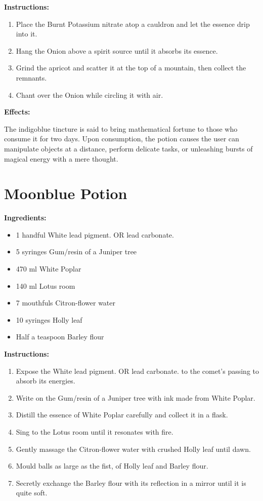 \documentclass{article}
\begin{document}
\textbf{Instructions:}

\begin{enumerate}
  \item Place the Burnt Potassium nitrate atop a cauldron and let the essence drip into it.
  \item Hang the Onion above a spirit source until it absorbs its essence.
  \item Grind the apricot and scatter it at the top of a mountain, then collect the remnants.
  \item Chant over the Onion while circling it with air.
\end{enumerate}

\textbf{Effects:}

The indigoblue tincture is said to bring mathematical fortune to those who consume it for two days. Upon consumption, the potion causes the user can manipulate objects at a distance, perform delicate tasks, or unleashing bursts of magical energy with a mere thought.

\newpage
\section*{Moonblue Potion}

\textbf{Ingredients:}

\begin{itemize}
  \item 1 handful White lead pigment. OR lead carbonate.
  \item 5 syringes Gum/resin  of a Juniper tree
  \item 470 ml White Poplar
  \item 140 ml Lotus room
  \item 7 mouthfuls Citron-flower water
  \item 10 syringes Holly leaf
  \item Half a teaspoon Barley flour
\end{itemize}

\textbf{Instructions:}

\begin{enumerate}
  \item Expose the White lead pigment. OR lead carbonate. to the comet’s passing to absorb its energies.
  \item Write on the Gum/resin  of a Juniper tree with ink made from White Poplar.
  \item Distill the essence of White Poplar carefully and collect it in a flask.
  \item Sing to the Lotus room until it resonates with fire.
  \item Gently massage the Citron-flower water with crushed Holly leaf until dawn.
  \item Mould balls as large as the fist, of Holly leaf and Barley flour.
  \item Secretly exchange the Barley flour with its reflection in a mirror until it is quite soft.
\end{enumerate}
\end{document}
